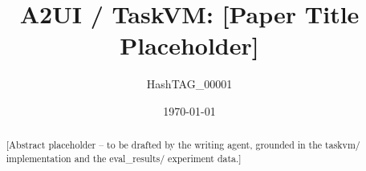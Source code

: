 \documentclass[11pt]{article}
\title{A2UI / TaskVM: [Paper Title Placeholder]}
\author{HashTAG\_00001}
\date{\today}
\begin{document}
\maketitle

\begin{abstract}
[Abstract placeholder -- to be drafted by the writing agent, grounded in
the taskvm/ implementation and the eval\_results/ experiment data.]
\end{abstract}









\end{document}
